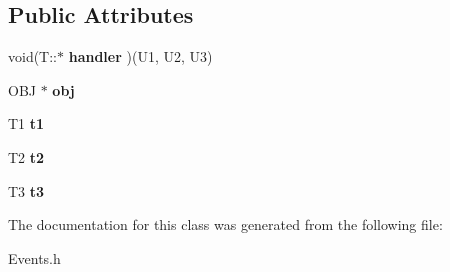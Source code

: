 \subsection*{Public Attributes}
\begin{DoxyCompactItemize}
\item 
\hypertarget{class_event3_a2b4a3b7dbddc1dc7954942e7b2fe5745}{void(T\-::$\ast$ {\bfseries handler} )(U1, U2, U3)}\label{class_event3_a2b4a3b7dbddc1dc7954942e7b2fe5745}

\item 
\hypertarget{class_event3_adf320f52db00df12079299c183cb84d0}{O\-B\-J $\ast$ {\bfseries obj}}\label{class_event3_adf320f52db00df12079299c183cb84d0}

\item 
\hypertarget{class_event3_ad42449bd6cd4193bfb6557dc54c51eb8}{T1 {\bfseries t1}}\label{class_event3_ad42449bd6cd4193bfb6557dc54c51eb8}

\item 
\hypertarget{class_event3_a40afc3cdc9d75a5b3163795b78a42497}{T2 {\bfseries t2}}\label{class_event3_a40afc3cdc9d75a5b3163795b78a42497}

\item 
\hypertarget{class_event3_a7aa650837c6a02999bcad51817b144ef}{T3 {\bfseries t3}}\label{class_event3_a7aa650837c6a02999bcad51817b144ef}

\end{DoxyCompactItemize}


The documentation for this class was generated from the following file\-:\begin{DoxyCompactItemize}
\item 
Events.\-h\end{DoxyCompactItemize}
